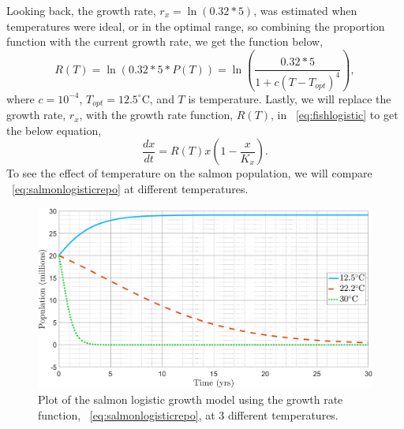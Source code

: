 Looking back, the growth rate, $r_x=\ln{(0.32*5)}$, was estimated when temperatures were ideal, or in the optimal range, so combining the proportion function with the current growth rate, we get the function below,
\begin{equation}\label{eq:RepoFunLog}
    R(T) = \ln(0.32*5*P(T))  = \ln{\left(\frac{0.32*5}{1+c(T-T_{opt})^4}\right)},
\end{equation}
where $c=10^{-4}$, $T_{opt}=12.5^{\circ}$C, and $T$ is temperature.
Lastly, we will replace the growth rate, $r_x$, with the growth rate function, $R(T)$, in \equationautorefname~\eqref{eq:fishlogistic} to get the below equation,
\begin{equation}\label{eq:salmonlogisticrepo} 
    \frac{dx}{dt} =
    R(T)x\left(1-\frac{x}{K_x}\right).
\end{equation}
To see the effect of temperature on the salmon population, we will compare \equationautorefname~\eqref{eq:salmonlogisticrepo} at different temperatures.
\begin{figure}[H]
    \centering
    \includegraphics[width=14cm]{Pictures/Salmon Pop/salmon repo model/Salmon at 3 dif temps.png}
    \caption{\singlespacing
    Plot of the salmon logistic growth model using the growth rate function, \equationautorefname~\eqref{eq:salmonlogisticrepo}, at 3 different temperatures.}
    \label{fig:salmonrepocomparison}
\end{figure}
